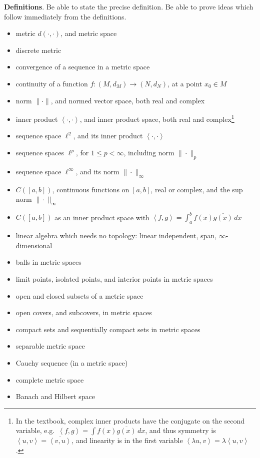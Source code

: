 \documentclass[12pt]{amsart}
\newcommand{\bigspacing}{\renewcommand{\baselinestretch}{1.21}\tiny\normalsize}
\newcommand{\ip}[2]{\left<#1,#2\right>}
\begin{document}
\bigspacing
\noindent \textbf{Definitions}.  Be able to state the precise definition.  Be able to prove ideas which follow immediately from the definitions.
\begin{itemize}
\item metric $d(\cdot,\cdot)$, and metric space
\item discrete metric
\item convergence of a sequence in a metric space
\item continuity of a function $f:(M,d_M) \to (N,d_N)$, at a point $x_0\in M$
\item norm $\|\cdot\|$, and normed vector space, both real and complex
\item inner product $\ip{\cdot}{\cdot}$, and inner product space, both real and complex\footnote{In the textbook, complex inner products have the conjugate on the second variable, e.g.~$\ip{f}{g} = \int f(x)\overline{g(x)}\,dx$, and thus symmetry is $\ip{u}{v}=\overline{\ip{v}{u}}$, and linearity is in the first variable $\ip{\lambda u}{v} = \lambda \ip{u}{v}$.}
\item sequence space $\ell^2$, and its inner product $\ip{\cdot}{\cdot}$
\item sequence spaces $\ell^p$, for $1\le p < \infty$, including norm $\|\cdot\|_p$
\item sequence space $\ell^\infty$, and its norm $\|\cdot\|_\infty$
\item $C([a,b])$, continuous functions on $[a,b]$, real or complex, and the sup norm $\|\cdot\|_\infty$
\item $C([a,b])$ as an inner product space with $\ip{f}{g}=\int_a^b f(x) \overline{g(x)}\,dx$
\item linear algebra which needs no topology: linear independent, span, $\infty$-dimensional
\item balls in metric spaces
\item limit points, isolated points, and interior points in metric spaces
\item open and closed subsets of a metric space
\item open covers, and subcovers, in metric spaces
\item compact sets and sequentially compact sets in metric spaces
\item separable metric space
\item Cauchy sequence (in a metric space)
\item complete metric space
\item Banach and Hilbert space

\end{itemize}
\end{document}
